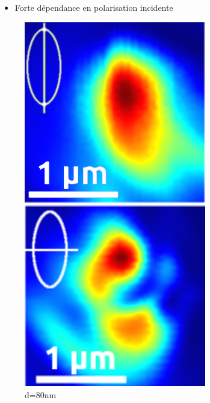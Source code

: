 \documentclass[9pt,a9paper,handout]{beamer}
\begin{document}
\begin{frame}
        \begin{itemize}
            \item Forte dépendance en polarisation incidente
        \end{itemize}
    \vspace*{-8mm}
        \begin{figure}[c]\flushright
            \includegraphics[height=0.15\textwidth]{Images/Scans/polar_long_2}
            \quad
            \includegraphics[height=0.15\textwidth]{Images/Scans/polar_trans}\\
            d=80nm
        \end{figure}
    \end{frame}
\end{document}
